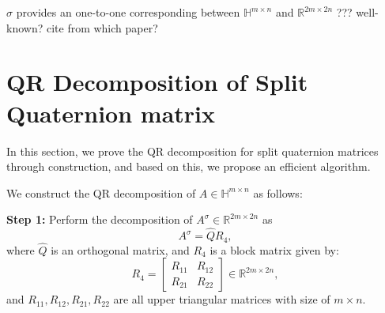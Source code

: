 \documentclass[12pt]{article}
\newtheorem{lemma}[theorem]{Lemma}
\newtheorem{corollary}[theorem]{Corollary}
\numberwithin{equation}{section} %
\begin{document}
{\color{red} $\sigma$ provides an one-to-one corresponding between $\mathbb{H}^{m\times n}$ and $\mathbb{R}^{2m \times 2n}$ ??? well-known? cite from which paper? }

\section{\textbf{QR Decomposition of Split Quaternion matrix}}
In this section, we prove the QR decomposition for split quaternion matrices through construction, and based on this, we propose an efficient algorithm.

We construct the QR decomposition of $A \in \mathbb{H}^{m \times n}$ as follows:

\textbf{Step 1:} Perform the decomposition of $A^\sigma \in \mathbb{R}^{2m \times 2n}$ as \begin{equation}\label{splitqr}A^\sigma = \hat{Q} R_4,\end{equation} where $\hat{Q}$ is an orthogonal matrix, and $R_4$ is a block matrix given by:
\begin{equation}\label{r4}
R_4 = \begin{bmatrix}
    R_{11} & R_{12} \\
    R_{21} & R_{22}
\end{bmatrix} \in \mathbb{R}^{2m \times 2n},
\end{equation}
and $R_{11}, R_{12},R_{21},R_{22}$ are all upper triangular matrices with size of  $m \times n$.
\end{document}
